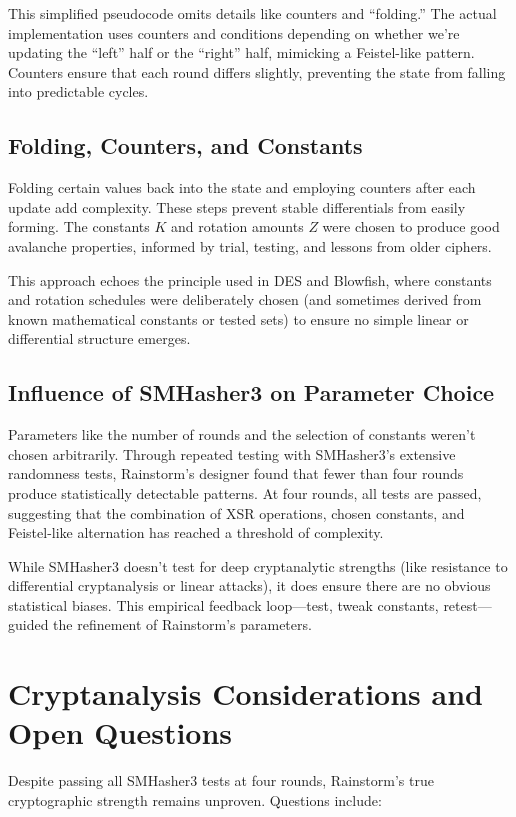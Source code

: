 \documentclass[11pt,a4paper]{article}
\begin{document}
This simplified pseudocode omits details like counters and “folding.” The actual implementation uses counters and conditions depending on whether we’re updating the “left” half or the “right” half, mimicking a Feistel-like pattern. Counters ensure that each round differs slightly, preventing the state from falling into predictable cycles.

\subsection*{Folding, Counters, and Constants}
Folding certain values back into the state and employing counters after each update add complexity. These steps prevent stable differentials from easily forming. The constants \( K \) and rotation amounts \( Z \) were chosen to produce good avalanche properties, informed by trial, testing, and lessons from older ciphers.

This approach echoes the principle used in DES and Blowfish, where constants and rotation schedules were deliberately chosen (and sometimes derived from known mathematical constants or tested sets) to ensure no simple linear or differential structure emerges.

\subsection*{Influence of SMHasher3 on Parameter Choice}
Parameters like the number of rounds and the selection of constants weren’t chosen arbitrarily. Through repeated testing with SMHasher3’s extensive randomness tests, Rainstorm’s designer found that fewer than four rounds produce statistically detectable patterns. At four rounds, all tests are passed, suggesting that the combination of XSR operations, chosen constants, and Feistel-like alternation has reached a threshold of complexity.

While SMHasher3 doesn’t test for deep cryptanalytic strengths (like resistance to differential cryptanalysis or linear attacks), it does ensure there are no obvious statistical biases. This empirical feedback loop—test, tweak constants, retest—guided the refinement of Rainstorm’s parameters.

\section*{Cryptanalysis Considerations and Open Questions}
Despite passing all SMHasher3 tests at four rounds, Rainstorm’s true cryptographic strength remains unproven. Questions include:
\end{document}
